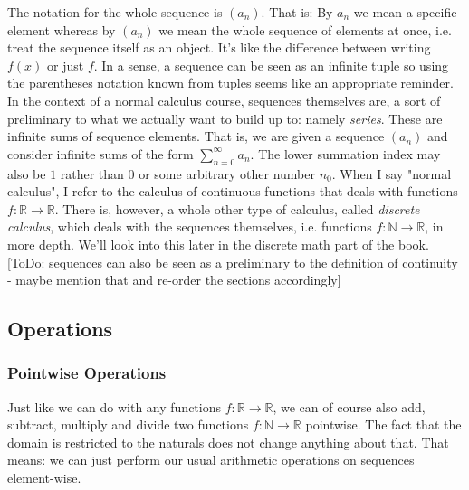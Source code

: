 \medskip
The notation for the whole sequence is $(a_n)$. That is: By $a_n$ we mean a specific element whereas by $(a_n)$ we mean the whole sequence of elements at once, i.e. treat the sequence itself as an object. It's like the difference between writing $f(x)$ or just $f$. In a sense, a sequence can be seen as an infinite tuple so using the parentheses notation known from tuples seems like an appropriate reminder. In the context of a normal calculus course, sequences themselves are, a sort of preliminary to what we actually want to build up to: namely \emph{series}. These are infinite sums of sequence elements. That is, we are given a sequence $(a_n)$ and consider infinite sums of the form $\sum_{n=0}^{\infty} a_n$. The lower summation index may also be $1$ rather than $0$ or some arbitrary other number $n_0$. When I say "normal calculus", I refer to the calculus of continuous functions that deals with functions $f: \mathbb{R} \rightarrow \mathbb{R}$. There is, however, a whole other type of calculus, called \emph{discrete calculus}, which deals with the sequences themselves, i.e. functions $f: \mathbb{N} \rightarrow \mathbb{R}$, in more depth. We'll look into this later in the discrete math part of the book. [ToDo: sequences can also be seen as a preliminary to the definition of continuity - maybe mention that and re-order the sections accordingly]


\subsection{Operations}

\subsubsection{Pointwise Operations}
Just like we can do with any functions $f: \mathbb{R} \rightarrow \mathbb{R}$, we can of course also add, subtract, multiply and divide two functions $f: \mathbb{N} \rightarrow \mathbb{R}$ pointwise. The fact that the domain is restricted to the naturals does not change anything about that. That means: we can just perform our usual arithmetic operations on sequences element-wise.

